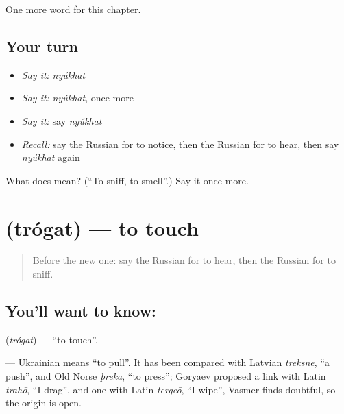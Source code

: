 \begin{grammarlens}[title={What you've built}]
One more word for this chapter.
\end{grammarlens}

\subsection*{Your turn}
\begin{itemize}
\raggedright
  \item \emph{Say it:} \emph{nyúkhat}
  \item \emph{Say it:} \emph{nyúkhat}, once more
  \item \emph{Say it:} say \emph{nyúkhat}
  \item \emph{Recall:} say the Russian for to notice, then the Russian for to hear, then say \emph{nyúkhat} again
\end{itemize}

\begin{tcolorbox}[breakable,colback=teal!4,colframe=teal!35!black,title={Before you move on}]
What does  mean? (\textquotedblleft{}To sniff, to smell\textquotedblright{}.) Say it once more.
\end{tcolorbox}
\section[\texorpdfstring{\ru{трогать} (trógat)}{трогать (trógat)}]{ (trógat) — to touch}

\label{lesson:RU-C208-trogat}



\begin{quote}
Before the new one: say the Russian for to hear, then the Russian for to sniff.
\end{quote}

\subsection*{You'll want to know: }
\textbf{} (\emph{trógat}) — \textquotedblleft{}to touch\textquotedblright{}.

\begin{cousinweb}
\textbf{} — Ukrainian \emph{} means \textquotedblleft{}to pull\textquotedblright{}. It has been compared with Latvian \emph{treksne}, \textquotedblleft{}a push\textquotedblright{}, and Old Norse \emph{þreka}, \textquotedblleft{}to press\textquotedblright{}; Goryaev proposed a link with Latin \emph{trahō}, \textquotedblleft{}I drag\textquotedblright{}, and one with Latin \emph{tergeō}, \textquotedblleft{}I wipe\textquotedblright{}, Vasmer finds doubtful, so the origin is open.
\end{cousinweb}

